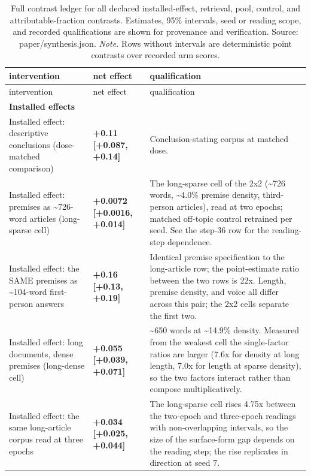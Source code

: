 \documentclass[10pt]{article}
\begin{document}
{\footnotesize
\begin{longtable}{ p{3.52cm}lp{8.16cm} }

\caption{ Full contrast ledger for all declared installed-effect, retrieval, pool, control, and attributable-fraction contrasts. Estimates, 95\% intervals, seed or reading scope, and recorded qualifications are shown for provenance and verification. Source: paper/synthesis.json. \emph{Note.} Rows without intervals are deterministic point contrasts over recorded arm scores. }
\label{tab:contribution_ladder}\\
\toprule
intervention & net effect & qualification \\
\midrule
\endfirsthead
\toprule
intervention & net effect & qualification \\
\midrule
\endhead
\bottomrule
\endfoot
\bottomrule
\endlastfoot

\textbf{ Installed effects } &  &  \\

Installed effect: descriptive conclusions (dose-matched comparison) & \textbf{ +0.11 [+0.087, +0.14] } & Conclusion-stating corpus at matched dose. \\

Installed effect: premises as \textasciitilde{}726-word articles (long-sparse cell) & \textbf{ +0.0072 [+0.0016, +0.014] } & The long-sparse cell of the 2x2 (\textasciitilde{}726 words, \textasciitilde{}4.0\% premise density, third-person articles), read at two epochs; matched off-topic control retrained per seed. See the step-36 row for the reading-step dependence. \\

Installed effect: the SAME premises as \textasciitilde{}104-word first-person answers & \textbf{ +0.16 [+0.13, +0.19] } & Identical premise specification to the long-article row; the point-estimate ratio between the two rows is 22x. Length, premise density, and voice all differ across this pair; the 2x2 cells separate the first two. \\

Installed effect: long documents, dense premises (long-dense cell) & \textbf{ +0.055 [+0.039, +0.071] } & \textasciitilde{}650 words at \textasciitilde{}14.9\% density. Measured from the weakest cell the single-factor ratios are larger (7.6x for density at long length, 7.0x for length at sparse density), so the two factors interact rather than compose multiplicatively. \\

Installed effect: the same long-article corpus read at three epochs & \textbf{ +0.034 [+0.025, +0.044] } & The long-sparse cell rises 4.75x between the two-epoch and three-epoch readings with non-overlapping intervals, so the size of the surface-form gap depends on the reading step; the rise replicates in direction at seed 7. \\


\end{longtable}}
\end{document}
